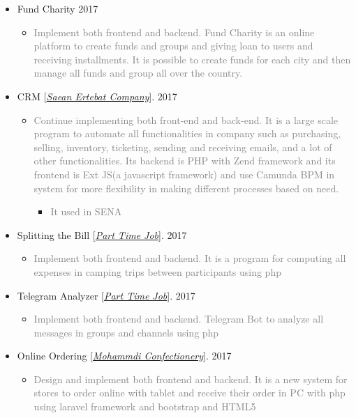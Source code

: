 \documentclass[10pt,a4paper,sans]{moderncv} %
\begin{document}
\begin{itemize}
		\item Fund Charity \hfill 2017
		\begin{itemize}
			\item \textcolor{gray} {  Implement both frontend and backend. Fund Charity is an online platform to create funds and groups and giving loan to users and receiving installments. It is possible to create funds for each city and then manage all funds and group all over the country. }
		\end{itemize}

		\item CRM [\href{http://www.senatelecom.com/}{\emph{Saean Ertebat Company}}]. \hfill 2017
		\begin{itemize}
			\item \textcolor{gray} {Continue implementing both front-end and back-end. It is a large scale program to automate all functionalities in company such as purchasing, selling, inventory, ticketing, sending and receiving emails, and a lot of other functionalities. Its backend is PHP with Zend framework and its frontend is Ext JS(a javascript framework) and use Camunda BPM in system for more flexibility in making different processes based on need.}
			\begin{itemize}
				\item \textcolor{gray} {It used in SENA}
			\end{itemize}
		\end{itemize}

		\item Splitting the Bill [\href{mailto:ma.mohammadizadeh@gmail.com}{\emph{Part Time Job}}]. \hfill 2017
		\begin{itemize}
			\item \textcolor{gray} {Implement both frontend and backend. It is a program for computing all expenses in camping trips between participants using php}
		\end{itemize}

		\item Telegram Analyzer [\href{mailto:ma.mohammadizadeh@gmail.com}{\emph{Part Time Job}}]. \hfill 2017
		\begin{itemize}
			\item \textcolor{gray} {Implement both frontend and backend. Telegram Bot to analyze all messages in groups and channels using php}
		\end{itemize}

		\item Online Ordering [\href{http://#/}{\emph{Mohammdi Confectionery}}]. \hfill 2017
		\begin{itemize}
			\item \textcolor{gray} {Design and implement both frontend and backend. It is a new system for stores to order online with tablet and receive their order in PC with php using laravel framework and bootstrap and HTML5}
		\end{itemize}


\end{itemize}
\end{document}
